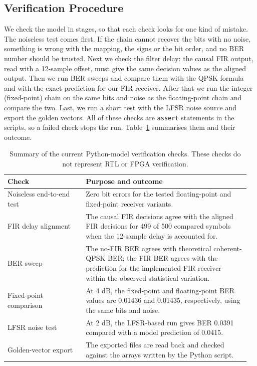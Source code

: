 \documentclass[10pt,twocolumn,letterpaper]{article}
\begin{document}
\subsection{Verification Procedure}
\label{sec:verif}

We check the model in stages, so that each check looks for one kind of
mistake. The noiseless test comes first. If the chain cannot recover the bits
with no noise, something is wrong with the mapping, the signs or the bit
order, and no BER number should be trusted. Next we check the filter delay:
the causal FIR output, read with a 12-sample offset, must give the same
decision values as the aligned output. Then we run BER sweeps and compare
them with the QPSK formula and with the exact prediction for our FIR
receiver. After that we run the integer (fixed-point) chain on the same bits
and noise as the floating-point chain and compare the two. Last, we run a
short test with the LFSR noise source and export the golden vectors. All of
these checks are \texttt{assert} statements in the scripts, so a failed check
stops the run. Table~\ref{tab:checks} summarises them and their outcome.

\begin{table}[t]
\centering
\small
\begin{tabular}{@{}p{0.31\linewidth}p{0.65\linewidth}@{}}
\toprule
Check & Purpose and outcome \\
\midrule
Noiseless end-to-end test & Zero bit errors for the tested floating-point and fixed-point receiver variants. \\
FIR delay alignment & The causal FIR decisions agree with the aligned FIR decisions for 499 of 500 compared symbols when the 12-sample delay is accounted for. \\
BER sweep & The no-FIR BER agrees with theoretical coherent-QPSK BER; the FIR BER agrees with the prediction for the implemented FIR receiver within the observed statistical variation. \\
Fixed-point comparison & At 4 dB, the fixed-point and floating-point BER values are 0.01436 and 0.01435, respectively, using the same bits and noise. \\
LFSR noise test & At 2 dB, the LFSR-based run gives BER 0.0391 compared with a model prediction of 0.0415. \\
Golden-vector export & The exported files are read back and checked against the arrays written by the Python script. \\
\bottomrule
\end{tabular}
\caption{Summary of the current Python-model verification checks. These checks do not represent RTL or FPGA verification.}
\label{tab:checks}
\end{table}
\end{document}
